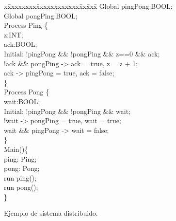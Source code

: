 \iffalse
\begin{figure}[t]
\begin{minipage}[t]{.47\textwidth}
\fontsize{6.6}{6.6}\selectfont\ttfamily
\begin{tabbing}
x\=xxxxxxxx\=xxxxxxxxxxxx\=xx\=xxx\= \kill
Global pingPong:BOOL; \\
Global pongPing:BOOL; \\[1ex]
Process Ping \{\\[1ex]
\>z:INT; \\
\>ack:BOOL; \\
\>Initial: !pingPong \&\& !pongPing \&\& z==0 \&\& ack;\\[1ex]
\>[receive] !ack \&\& pongPing -> ack = true, z = z + 1; \\
\>[send] ack -> pingPong = true, ack = false; \\
\} \\[1ex]

Process Pong \{\\[1ex]
\>wait:BOOL; \\
\>Initial: !pingPong \&\& !pongPing \&\& wait;\\[1ex]

\>[send] !wait -> pongPing = true, wait = true; \\
\>[receive] wait \&\& pingPong -> wait = false; \\
\} \\[1ex]

Main()\{\\[1ex]
\>ping: Ping; \\
\>pong: Pong; \\
\>run ping(); \\
\>run pong(); \\
\}\\
\end{tabbing}
\end{minipage}
\hfill
\vspace{-0.5cm}
\caption{Ejemplo de sistema distribuido.} \label{fig:exam_language}
\vspace{-0.5cm}
\end{figure}

